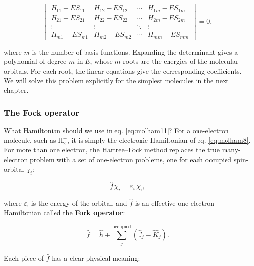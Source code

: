\documentclass[
  english,
  9pt,
]{extbook}
\theoremstyle{definition}
\theoremstyle{definition}
\theoremstyle{definition}
\theoremstyle{definition}
\theoremstyle{remark}
\begin{document}
\begin{equation}
\begin{vmatrix}
H_{11}-ES_{11}   & H_{12}-ES_{12}   & \cdots & H_{1m}-ES_{1m}\\
H_{21}-ES_{21}   & H_{22}-ES_{22}   & \cdots & H_{2m}-ES_{2m}\\
\vdots           &   \vdots         & \ddots & \vdots\\
H_{m1}-ES_{m1}   & H_{m2}-ES_{m2}   & \cdots & H_{mm}-ES_{mm}
\end{vmatrix}=0,
\label{eq:molham12}
\end{equation}

where \(m\) is the number of basis functions. Expanding the determinant gives a polynomial of degree \(m\) in \(E\), whose \(m\) roots are the energies of the molecular orbitals. For each root, the linear equations give the corresponding coefficients. We will solve this problem explicitly for the simplest molecules in the next chapter.

\subsubsection*{The Fock operator}\label{the-fock-operator}

What Hamiltonian should we use in eq. \eqref{eq:molham11}? For a one-electron molecule, such as \(\mathrm{H}_2^+\), it is simply the electronic Hamiltonian of eq. \eqref{eq:molham8}. For more than one electron, the Hartree--Fock method replaces the true many-electron problem with a set of one-electron problems, one for each occupied spin-orbital \(\chi_i\):

\begin{equation}
\hat{f}\, \chi_i = \varepsilon_i\, \chi_i,
\label{eq:hfeq1}
\end{equation}

where \(\varepsilon_i\) is the energy of the orbital, and \(\hat{f}\) is an effective one-electron Hamiltonian called the \textbf{Fock operator}:

\begin{equation}
\hat{f} = \hat{h} + \sum_{j}^{\text{occupied}} \left( \hat{J}_j - \hat{K}_j \right).
\label{eq:hfeq2}
\end{equation}

Each piece of \(\hat{f}\) has a clear physical meaning:
\end{document}
